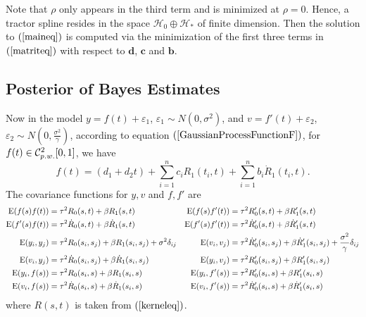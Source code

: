 Note that $\rho$ only appears in the third term and is minimized at $\rho=0$. Hence, a tractor spline resides in the space $\mathcal{H}_0\oplus \mathcal{H}_*$ of finite dimension. Then the solution to $(\ref{maineq})$ is computed via the minimization of the first three terms in $(\ref{matriteq})$ with respect to $\mathbf{d}$, $\mathbf{c}$ and $\mathbf{b}$.



\subsection{Posterior of Bayes Estimates}


Now in the model $y=f(t)+\varepsilon_1$, $\varepsilon_1 \sim N(0,\sigma^2)$, and $v=f '(t)+\varepsilon_2$, $\varepsilon_2\sim N(0, \frac{\sigma^2}{\gamma})$, according to equation $(\ref{GaussianProcessFunctionF})$, for $f(t) \in \mathcal{C}_{\footnotesize p.w.}^{2}[0,1]$, we have 
\begin{equation}
f(t)=(d_1+d_2t)+\sum_{i=1}^{n}c_iR_1(t_i,t)+\sum_{i=1}^{n}b_i\dot{R}_1(t_i,t).
\end{equation}
The covariance functions for $y,v$ and $f , f '$ are
\begin{align*}
\mathrm{E} (f(s)f (t))&=\tau^2R_0(s,t)+\beta R_1(s,t) & \mathrm{E} (f(s)f '(t))&=\tau^2R_0'(s,t)+\beta R_1'(s,t) \\
\mathrm{E} (f '(s)f (t))&=\tau^2\dot{R}_0(s,t)+\beta\dot{R}_1(s,t) & \mathrm{E} (f '(s)f '(t))&=\tau^2\dot{R}'_0(s,t)+\beta\dot{R}'_1(s,t) \\
\footnotesize \mathrm{E} (y_i,y_j)&=\tau^2R_0(s_i,s_j)+\beta R_1(s_i,s_j)+\sigma^2\delta_{ij}   & 
\mathrm{E} (v_i,v_j)&=\tau^2\dot{R}'_0(s_i,s_j)+\beta\dot{R}'_1(s_i,s_j) +\frac{\sigma^2}{\gamma}\delta_{ij} \\ 
\normalsize
\mathrm{E} (v_i,y_j)&=\tau^2\dot{R}_0(s_i,s_j)+\beta \dot{R}_1(s_i,s_j) &
\mathrm{E} (y_i,v_j)&=\tau^2R_0'(s_i,s_j)+\beta R_1'(s_i,s_j)\\
\mathrm{E} (y_i,f(s))&=\tau^2 R_0(s_i,s)+\beta R_1(s_i,s)  & \mathrm{E} (y_i,f '(s))&=\tau^2 R'_0(s_i,s)+\beta R'_1(s_i,s)  \\
\mathrm{E} (v_i,f(s))&=\tau^2 \dot{R}_0(s_i,s)+\beta \dot{R}_1(s_i,s) & \mathrm{E} (v_i,f '(s))&=\tau^2\dot{R}'_0(s_i,s)+\beta \dot{R}'_1(s_i,s)
\end{align*}
where $R(s,t)$ is taken from $(\ref{kerneleq})$. 


